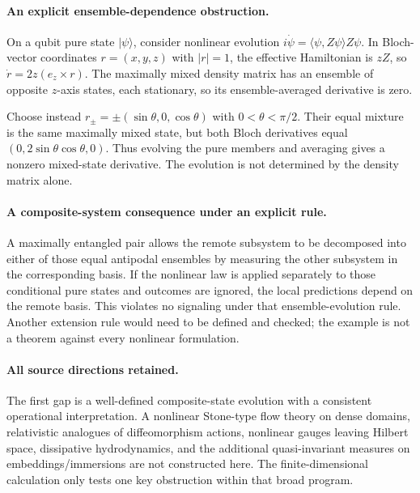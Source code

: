 \documentclass[11pt]{article}
\begin{document}
\paragraph{An explicit ensemble-dependence obstruction.} On a qubit pure state $|\psi\rangle$, consider nonlinear evolution $i\dot\psi=\langle\psi,Z\psi\rangle Z\psi$. In Bloch-vector coordinates $r=(x,y,z)$ with $|r|=1$, the effective Hamiltonian is $zZ$, so $\dot r=2z(e_z\times r)$. The maximally mixed density matrix has an ensemble of opposite $z$-axis states, each stationary, so its ensemble-averaged derivative is zero.

Choose instead $r_\pm=\pm(\sin\theta,0,\cos\theta)$ with $0<\theta<\pi/2$. Their equal mixture is the same maximally mixed state, but both Bloch derivatives equal $(0,2\sin\theta\cos\theta,0)$. Thus evolving the pure members and averaging gives a nonzero mixed-state derivative. The evolution is not determined by the density matrix alone.

\paragraph{A composite-system consequence under an explicit rule.} A maximally entangled pair allows the remote subsystem to be decomposed into either of those equal antipodal ensembles by measuring the other subsystem in the corresponding basis. If the nonlinear law is applied separately to those conditional pure states and outcomes are ignored, the local predictions depend on the remote basis. This violates no signaling under that ensemble-evolution rule. Another extension rule would need to be defined and checked; the example is not a theorem against every nonlinear formulation.

\paragraph{All source directions retained.} The first gap is a well-defined composite-state evolution with a consistent operational interpretation. A nonlinear Stone-type flow theory on dense domains, relativistic analogues of diffeomorphism actions, nonlinear gauges leaving Hilbert space, dissipative hydrodynamics, and the additional quasi-invariant measures on embeddings/immersions are not constructed here. The finite-dimensional calculation only tests one key obstruction within that broad program.
\end{document}
